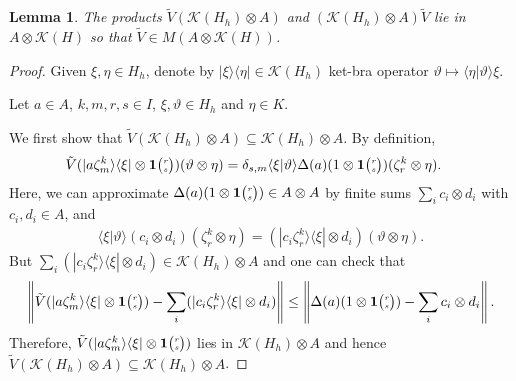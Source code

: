 \documentclass[11pt]{article}
\newcommand{\Grt}[3]{#1{\tiny {\begin{pmatrix} #2\\#3\end{pmatrix}}}}
\newcommand{\UnitC}[2]{\Grt{\mathbf{1}}{#1}{#2}}
\newtheorem{Lem}[Theorem]{Lemma}
\theoremstyle{definition}
\numberwithin{equation}{section}
\begin{document}
 \begin{Lem}\label{lem:reg-corep-mult}
   The products $ \tilde V(\mathcal{K}(H_{h})\otimes A)$ and 
   $(\mathcal{K}(H_{h}) \otimes A)\tilde V$ lie in $A \otimes
   \mathcal{K}(H)$ so that $\tilde V \in M(A\otimes \mathcal{K}(H))$.
 \end{Lem}
 \begin{proof}
   Given $\xi,\eta\in H_{h}$, denote by $|\xi\rangle\langle \eta| \in \mathcal{K}(H_{h})$ ket-bra
   operator $\vartheta \mapsto \langle \eta|\vartheta\rangle \xi$. 

   Let $a\in A$, $k,m,r,s\in I$, $\xi,\vartheta \in H_{h}$ and
   $\eta\in K$. 
   
   We first show that $\tilde V(\mathcal{K}(H_{h})\otimes A) \subseteq
   \mathcal{K}(H_{h}) \otimes A$. By definition,\begin{align*}
     \tilde V(|a\zeta^{k}_{m}\rangle\langle \xi| \otimes \UnitC{r}{s})(\vartheta \otimes \eta) 
     &=     \delta_{s,m} \langle \xi|\vartheta\rangle \Delta(a)(1 \otimes \UnitC{r}{s})(\zeta^{k}_{r}
     \otimes \eta).
   \end{align*} 
   Here, we can approximate $\Delta(a)(1\otimes \UnitC{r}{s}) \in A\otimes A$ by finite sums $\sum_{i} c_{i} \otimes
   d_{i}$ with $c_{i},d_{i} \in A$, and
   \begin{align*}
 \langle \xi|\vartheta\rangle (c_{i} \otimes
d_{i})(\zeta^{k}_{r} \otimes \eta) = 
 (|c_{i}\zeta^{k}_{r}\rangle\langle \xi| \otimes d_{i}) (\vartheta \otimes \eta).
   \end{align*}
But  $\sum_{i} (|c_{i}\zeta^{k}_{r}\rangle\langle \xi| \otimes d_{i}) \in \mathcal{K}(H_{h}) \otimes
A$  and   one can check that
   \begin{align*}
     \left\|\tilde V(|a\zeta^{k}_{m}\rangle\langle \xi| \otimes \UnitC{r}{s}) -      \sum_{i}
       (|c_{i}\zeta^{k}_{r}\rangle\langle \xi| \otimes d_{i})\right\| \leq
     \left\|\Delta(a)(1\otimes \UnitC{r}{s}) -  \sum_{i} c_{i} \otimes
   d_{i}\right\|.
   \end{align*}
   Therefore, $\tilde V(|a\zeta^{k}_{m}\rangle\langle \xi| \otimes \UnitC{r}{s})$ lies in
   $\mathcal{K}(H_{h}) \otimes A$ and hence $\tilde V(\mathcal{K}(H_{h})\otimes A) \subseteq
   \mathcal{K}(H_{h}) \otimes A$.
   


\end{proof}
\end{document}
